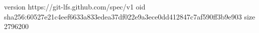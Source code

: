 version https://git-lfs.github.com/spec/v1
oid sha256:60527e21c4eef6633a833edea37df022e9a3ece0dd412847c7af590ff3b9e903
size 2796200
